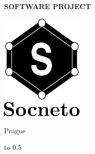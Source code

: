 

\pagestyle{empty}
\begin{center}



\vspace{-8mm}
\vfill

{\bf\Large SOFTWARE PROJECT}

\vfill

\vfill
{\LARGE\ThesisAuthor}

\vspace{15mm}

{\LARGE\bfseries\ThesisTitle}

\vfill
\centerline{\mbox{\includegraphics[width=40mm]{diagrams/fsocneto_icon.png}}}
\vfill
Prague \YearSubmitted
\end{center}
\newpage






\vbox to 0.5

\newpage


\noindent
\Dedication

\pagestyle{plain}
\setcounter{page}{1}
